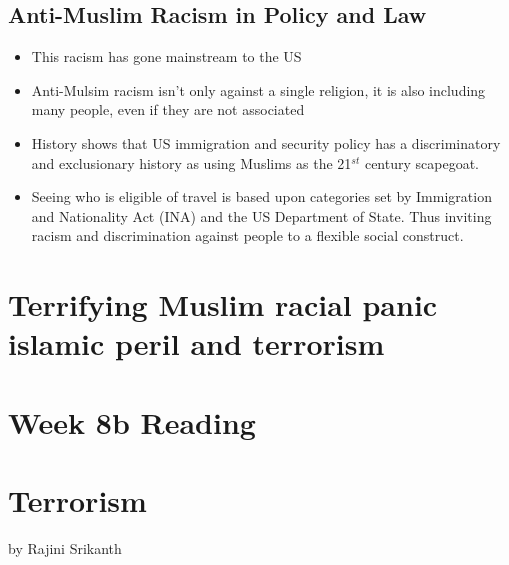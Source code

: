 \documentclass{article}
\begin{document}
  \subsection{Anti-Muslim Racism in Policy and Law}
  \begin{itemize}
    \item This racism has gone mainstream to the US
    \item Anti-Mulsim racism isn't only against a single religion, it is
      also including many people, even if they are not associated
    \item History shows that US immigration and security policy
      has a discriminatory and exclusionary history as using
      Muslims as the 21$^{st}$ century scapegoat.
    \item Seeing who is eligible of travel is based upon categories set by
      Immigration and Nationality Act (INA) and the US Department of State.
      Thus inviting racism and discrimination against people to a flexible social
      construct.
  \end{itemize}

  \section{Terrifying Muslim racial panic islamic peril and terrorism}


  \newpage
\section*{Week 8b Reading}

\section{Terrorism}
by Rajini Srikanth
\end{document}
